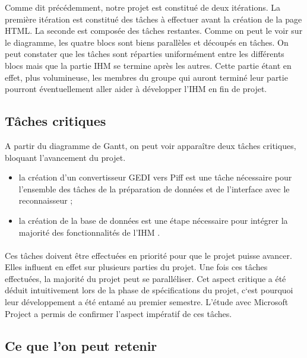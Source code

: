 Comme dit précédemment, notre projet est constitué de deux itérations. La première itération est constitué des tâches à effectuer avant la création de la page HTML. La seconde est composée des tâches restantes. Comme on peut le voir sur le diagramme, les quatre blocs sont biens parallèles et découpés en tâches. On peut constater que les tâches sont réparties uniformément entre les différents blocs mais que la partie IHM se termine après les autres. Cette partie étant en effet, plus volumineuse, les membres du groupe qui auront terminé leur partie pourront éventuellement aller aider à développer l’IHM en fin  de projet.

\subsection{Tâches critiques}

A partir du diagramme de Gantt, on peut voir apparaître deux tâches critiques, bloquant l’avancement du projet.

\begin{itemize}
\item la création d’un convertisseur GEDI vers Piff est une tâche nécessaire pour l’ensemble des tâches de la préparation de données et de l’interface avec le reconnaisseur ;
\item la création de la base de données est une étape nécessaire pour intégrer la majorité des fonctionnalités de l’IHM .
\end{itemize}

\paragraph{}

Ces tâches doivent être effectuées en priorité pour que le projet puisse avancer. Elles influent en effet sur plusieurs parties du projet. Une fois ces tâches effectuées, la majorité du projet peut se paralléliser. Cet aspect critique a été déduit intuitivement lors de la phase de spécifications du projet, c‘est pourquoi leur développement a été entamé au premier semestre. L’étude avec Microsoft Project a permis de confirmer l’aspect impératif de ces tâches.

\subsection{Ce que l'on peut retenir}

